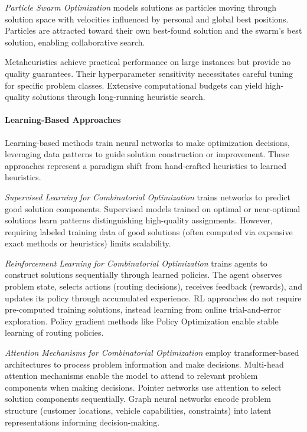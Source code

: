 \textit{Particle Swarm Optimization} models solutions as particles moving through solution space with velocities influenced by personal and global best positions. Particles are attracted toward their own best-found solution and the swarm's best solution, enabling collaborative search.

Metaheuristics achieve practical performance on large instances but provide no quality guarantees. Their hyperparameter sensitivity necessitates careful tuning for specific problem classes. Extensive computational budgets can yield high-quality solutions through long-running heuristic search.

\paragraph{Learning-Based Approaches}

Learning-based methods train neural networks to make optimization decisions, leveraging data patterns to guide solution construction or improvement. These approaches represent a paradigm shift from hand-crafted heuristics to learned heuristics.

\textit{Supervised Learning for Combinatorial Optimization} trains networks to predict good solution components. Supervised models trained on optimal or near-optimal solutions learn patterns distinguishing high-quality assignments. However, requiring labeled training data of good solutions (often computed via expensive exact methods or heuristics) limits scalability.

\textit{Reinforcement Learning for Combinatorial Optimization} trains agents to construct solutions sequentially through learned policies. The agent observes problem state, selects actions (routing decisions), receives feedback (rewards), and updates its policy through accumulated experience. RL approaches do not require pre-computed training solutions, instead learning from online trial-and-error exploration. Policy gradient methods like Policy Optimization enable stable learning of routing policies.

\textit{Attention Mechanisms for Combinatorial Optimization} employ transformer-based architectures to process problem information and make decisions. Multi-head attention mechanisms enable the model to attend to relevant problem components when making decisions. Pointer networks use attention to select solution components sequentially. Graph neural networks encode problem structure (customer locations, vehicle capabilities, constraints) into latent representations informing decision-making.

